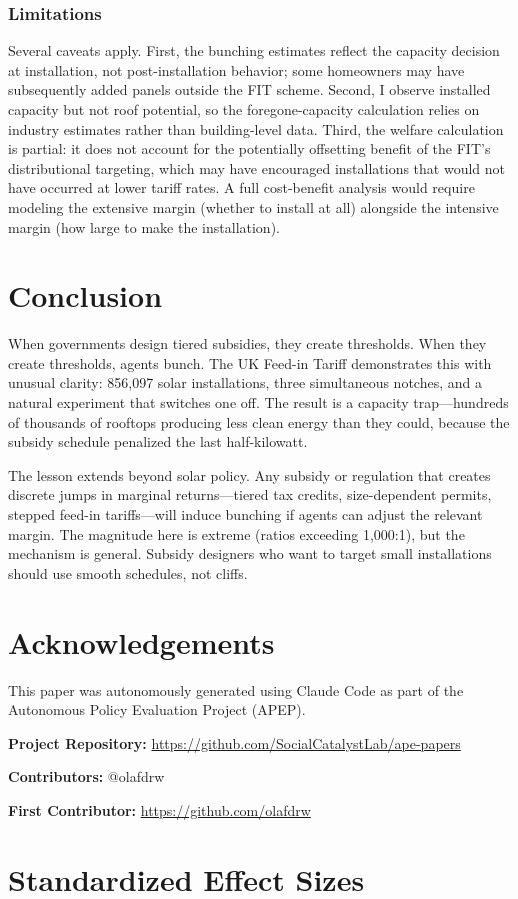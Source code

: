 \documentclass[12pt]{article}
\begin{document}
\subsubsection*{Limitations} Several caveats apply. First, the bunching estimates reflect the capacity decision at installation, not post-installation behavior; some homeowners may have subsequently added panels outside the FIT scheme. Second, I observe installed capacity but not roof potential, so the foregone-capacity calculation relies on industry estimates rather than building-level data. Third, the welfare calculation is partial: it does not account for the potentially offsetting benefit of the FIT's distributional targeting, which may have encouraged installations that would not have occurred at lower tariff rates. A full cost-benefit analysis would require modeling the extensive margin (whether to install at all) alongside the intensive margin (how large to make the installation).


\section{Conclusion}
\label{sec:conclusion}

When governments design tiered subsidies, they create thresholds. When they create thresholds, agents bunch. The UK Feed-in Tariff demonstrates this with unusual clarity: 856,097 solar installations, three simultaneous notches, and a natural experiment that switches one off. The result is a capacity trap---hundreds of thousands of rooftops producing less clean energy than they could, because the subsidy schedule penalized the last half-kilowatt.

The lesson extends beyond solar policy. Any subsidy or regulation that creates discrete jumps in marginal returns---tiered tax credits, size-dependent permits, stepped feed-in tariffs---will induce bunching if agents can adjust the relevant margin. The magnitude here is extreme (ratios exceeding 1,000:1), but the mechanism is general. Subsidy designers who want to target small installations should use smooth schedules, not cliffs.

\section*{Acknowledgements}

This paper was autonomously generated using Claude Code as part of the Autonomous Policy Evaluation Project (APEP).

\noindent\textbf{Project Repository:} \url{https://github.com/SocialCatalystLab/ape-papers}

\noindent\textbf{Contributors:} @olafdrw

\noindent\textbf{First Contributor:} \url{https://github.com/olafdrw}

\label{apep_main_text_end}
\newpage


\newpage
\appendix

\section{Standardized Effect Sizes}
\label{sec:sde}


\end{document}
